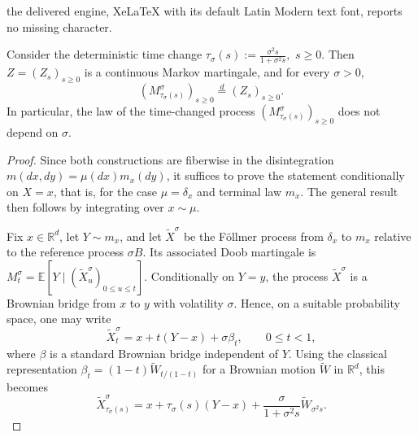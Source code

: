 \documentclass[10pt,a4paper]{amsart}
\newcommand{\E}{\mathbb{E}}
\newcommand{\R}{\mathbb{R}}
\begin{document}
the delivered engine, XeLaTeX with its default Latin Modern text font, reports no missing character.
	\begin{theorem}\label{thm:intro_scaling_filter}
		Consider the deterministic time change 
		\( 
		\tau_\sigma(s):=\frac{\sigma^2 s}{1+\sigma^2 s},\) \( s\ge 0.
		\)
		Then \(Z=(Z_s)_{s\ge 0}\) is a continuous Markov martingale, and for every \(\sigma>0\),
		\[
		(M^\sigma_{\tau_\sigma(s)})_{s\ge 0}\stackrel{d}{=}(Z_s)_{s\ge 0}.
		\]
		In particular, the law of the time-changed process \((M^\sigma_{\tau_\sigma(s)})_{s\ge 0}\) does not depend on \(\sigma\).
	\end{theorem}

	\begin{proof}
		Since both constructions are fiberwise in the disintegration \(m(dx,dy)=\mu(dx)m_x(dy)\), it suffices to prove the statement conditionally on \(X=x\), that is, for the case \(\mu=\delta_x\) and terminal law \(m_x\). The general result then follows by integrating over \(x\sim\mu\).
		
		Fix \(x\in\R^d\), let \(Y\sim m_x\), and let \(\widetilde X^\sigma\) be the F\"ollmer process from \(\delta_x\) to \(m_x\) relative to the reference process \(\sigma B\). Its associated Doob martingale is \(M_t^\sigma=\E[Y\mid (\widetilde X_u^\sigma)_{0\le u\le t}]\). Conditionally on \(Y=y\), the process \(\widetilde X^\sigma\) is a Brownian bridge from \(x\) to \(y\) with volatility \(\sigma\). Hence, on a suitable probability space, one may write
		\[
		\widetilde X_t^\sigma=x+t(Y-x)+\sigma \beta_t,\qquad 0\le t<1,
		\]
		where \(\beta\) is a standard Brownian bridge independent of \(Y\). Using the classical representation \(\beta_t=(1-t)\widetilde W_{t/(1-t)}\) for a Brownian motion \(\widetilde W\) in \(\R^d\), this becomes
		\[
		\widetilde X_{\tau_\sigma(s)}^\sigma
		=
		x+\tau_\sigma(s)(Y-x)+\frac{\sigma}{1+\sigma^2 s}\widetilde W_{\sigma^2 s}.
		\]
		

\end{proof}
\end{document}
